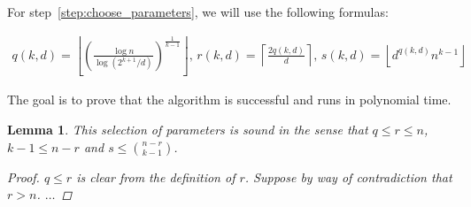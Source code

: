 \documentclass[12pt]{article}
\newtheorem{lemma}[thm]{Lemma}
\begin{document}
    For step~\ref{step:choose_parameters}, we will use the following formulas:

    \begin{align*}
            q(k, d) = \left\lfloor \left(  \frac{\log n}{\log (2^{k+1}/d)} \right)^{\frac{1}{k-1}} \right\rfloor,\,
            r(k, d) = \left \lceil \frac{2q(k, d)}{d} \right \rceil,\,
            s(k, d) = \left\lfloor d^{q(k, d)} n^{k-1} \right\rfloor
    \end{align*}

    The goal is to prove that the algorithm is successful and runs in polynomial time.

    \begin{lemma}
        This selection of parameters is sound in the sense that $q  \leq r \leq n$, $k - 1 \leq n - r$ and $s \leq \binom{n - r}{k - 1}$.

        \begin{proof}
            $q \leq r$ is clear from the definition of $r$.
            Suppose by way of contradiction that $r > n$. \color{red} $\ldots$ %



        \end{proof}

    \end{lemma}
\end{document}
